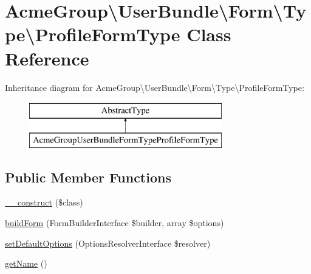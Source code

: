 \hypertarget{class_acme_group_1_1_user_bundle_1_1_form_1_1_type_1_1_profile_form_type}{\section{Acme\+Group\textbackslash{}User\+Bundle\textbackslash{}Form\textbackslash{}Type\textbackslash{}Profile\+Form\+Type Class Reference}
\label{class_acme_group_1_1_user_bundle_1_1_form_1_1_type_1_1_profile_form_type}
}
Inheritance diagram for Acme\+Group\textbackslash{}User\+Bundle\textbackslash{}Form\textbackslash{}Type\textbackslash{}Profile\+Form\+Type\+:\begin{figure}[H]
\begin{center}
\leavevmode
\includegraphics[height=2.000000cm]{class_acme_group_1_1_user_bundle_1_1_form_1_1_type_1_1_profile_form_type}
\end{center}
\end{figure}
\subsection*{Public Member Functions}
\begin{DoxyCompactItemize}
\item 
\hyperlink{class_acme_group_1_1_user_bundle_1_1_form_1_1_type_1_1_profile_form_type_ab2c8651dd03894aaf803e2f19fb00ef1}{\+\_\+\+\_\+construct} (\$class)
\item 
\hyperlink{class_acme_group_1_1_user_bundle_1_1_form_1_1_type_1_1_profile_form_type_a04b45a5f85205e3382c669279aea3239}{build\+Form} (Form\+Builder\+Interface \$builder, array \$options)
\item 
\hyperlink{class_acme_group_1_1_user_bundle_1_1_form_1_1_type_1_1_profile_form_type_af68313b3387bd2f224003b34a5be4a4a}{set\+Default\+Options} (Options\+Resolver\+Interface \$resolver)
\item 
\hyperlink{class_acme_group_1_1_user_bundle_1_1_form_1_1_type_1_1_profile_form_type_aa20282fed3c374279ffc30a0dc1c656c}{get\+Name} ()
\end{DoxyCompactItemize}
